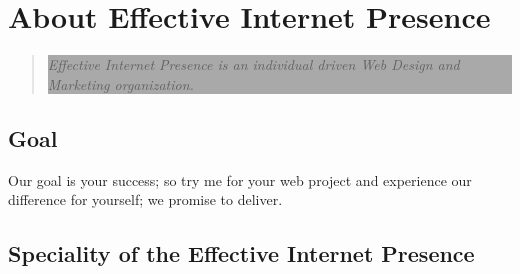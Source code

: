 \documentclass[35pt]{report}
\begin{document}
\normalsize

	\chapter{About Effective Internet Presence}
	\begin{quote}
		\colorbox{darkgray}{
		\parbox[t]{1.0\linewidth}{
       	\begin{center} 
			\fontsize{18pt}{11pt}\selectfont 
			\vspace*{.1cm}
				{\color{white} \it Effective Internet Presence is an individual driven Web Design and Marketing organization.\par}
			\vspace*{.1cm}
		\end{center}
		}
		}
	\end{quote}
		\begin{quote}
		\fontsize{20pt}{11pt}\selectfont 
		 
		\end{quote}
		
		\section{Goal}
		Our goal is your success; so try me for your web project and experience our difference for yourself; we promise to deliver.

		\section{Speciality of the Effective Internet Presence }
		
\end{document}
